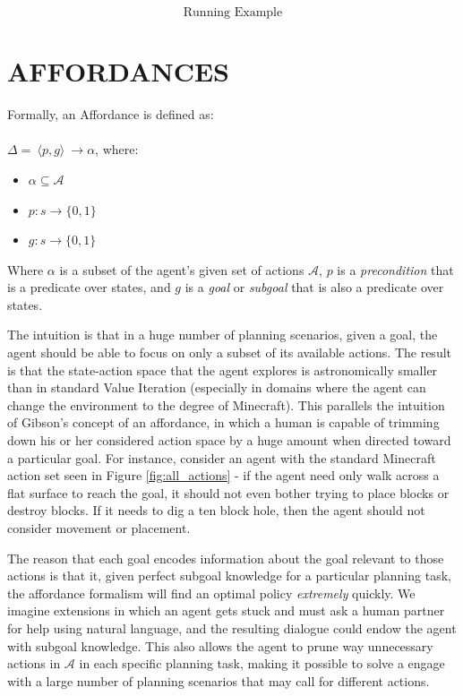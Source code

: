 \documentclass[]{article}
\begin{document}
\[
\boxed{\text{Running Example}}
\]

\section{AFFORDANCES}

Formally, an Affordance is defined as: \\ \\
\vspace{1 mm} $\Delta =\ \langle p,g\rangle\ \longrightarrow \alpha$, where:

\begin{itemize}
\item[] $\alpha \subseteq \mathcal{A}$
\item[] $p : s \longrightarrow \{$0$, 1\}$
\item[] $g : s \longrightarrow \{$0$,1\}$
\end{itemize}

Where $\alpha$ is a subset of the agent's given set of actions $\mathcal{A}$, $p$ is a {\it precondition} that is a predicate over states, and $g$ is a {\it goal} or {\it subgoal} that is also a predicate over states.

The intuition is that in a huge number of planning scenarios, given a goal, the agent should be able to focus on only a subset of its available actions. The result is that the state-action space that the agent explores is astronomically smaller than in standard Value Iteration (especially in domains where the agent can change the environment to the degree of Minecraft). This parallels the intuition of Gibson's concept of an affordance, in which a human is capable of trimming down his or her considered action space by a huge amount when directed toward a particular goal. For instance, consider an agent with the standard Minecraft action set seen in Figure \ref{fig:all_actions} - if the agent need only walk across a flat surface to reach the goal, it should not even bother trying to place blocks or destroy blocks. If it needs to dig a ten block hole, then the agent should not consider movement or placement.

The reason that each goal encodes information about the goal relevant to those actions is that it, given perfect subgoal knowledge for a particular planning task, the affordance formalism will find an optimal policy {\it extremely} quickly. We imagine extensions in which an agent gets stuck and must ask a human partner for help using natural language, and the resulting dialogue could endow the agent with subgoal knowledge. This also allows the agent to prune way unnecessary actions in $\mathcal{A}$ in each specific planning task, making it possible to solve a engage with a large number of planning scenarios that may call for different actions.
\end{document}
